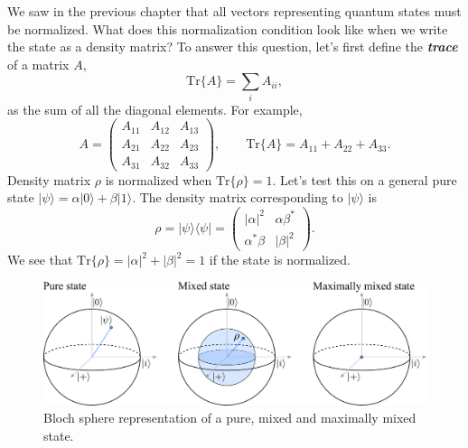 We saw in the previous chapter that all vectors representing quantum states must be normalized.
What does this normalization condition look like when we write the state as a density matrix?
To answer this question, let's first define the \textit{\textbf{trace}} of a matrix $A$,
\begin{equation}
    \text{Tr} \{ A \} = \sum_i A_{ii},
\end{equation}
as the sum of all the diagonal elements.
For example,
\begin{equation}
    A = \begin{pmatrix} A_{11} & A_{12} & A_{13} \\ A_{21} & A_{22} & A_{23} \\ A_{31} & A_{32} & A_{33} \end{pmatrix}, \qquad \text{Tr} \{ A \} = A_{11} + A_{22} + A_{33}.
\end{equation}
Density matrix $\rho$ is normalized when $\text{Tr}\{\rho\}=1$.
Let's test this on a general pure state $|\psi\rangle = \alpha |0\rangle + \beta |1\rangle$.
The density matrix  corresponding to $|\psi\rangle$ is
\begin{equation}
    \rho = |\psi\rangle\langle\psi| = \begin{pmatrix} |\alpha|^2 & \alpha\beta^* \\ \alpha^*\beta & |\beta|^2 \end{pmatrix}.
\end{equation}
We see that $\text{Tr}\{\rho\} = |\alpha|^2 + |\beta|^2 = 1$ if the state is normalized.

\begin{figure}[t]
    \centering
    \includegraphics[width=\textwidth]{lesson3/3-3_bloch.pdf}
    \caption[Bloch sphere and mixed states]{Bloch sphere representation of a pure, mixed and maximally mixed state.}
    \label{fig:3-3_bloch}
\end{figure}


